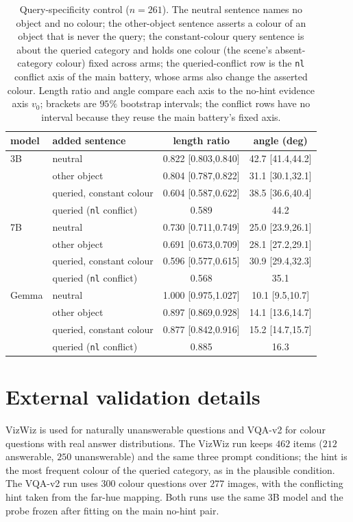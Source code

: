 \documentclass[10pt]{article}
\begin{document}
\begin{table}[h]
\centering
\small
\caption{Query-specificity control ($n=261$). The neutral sentence names no
object and no colour; the other-object sentence asserts a colour of an object
that is never the query; the constant-colour query sentence is about the
queried category and holds one colour (the scene's absent-category colour)
fixed across arms; the queried-conflict row is the \texttt{nl} conflict axis
of the main battery, whose arms also change the asserted colour. Length ratio
and angle compare each axis to the no-hint evidence axis $v_0$; brackets are
$95\%$ bootstrap intervals; the conflict rows have no interval because they
reuse the main battery's fixed axis.}
\label{tab:query-control}
\begin{tabular}{llcc}
\toprule
model & added sentence & length ratio & angle (deg) \\
\midrule
3B & neutral & 0.822 [0.803,0.840] & 42.7 [41.4,44.2] \\
   & other object & 0.804 [0.787,0.822] & 31.1 [30.1,32.1] \\
   & queried, constant colour & 0.604 [0.587,0.622] & 38.5 [36.6,40.4] \\
   & queried (\texttt{nl} conflict) & 0.589 & 44.2 \\
\midrule
7B & neutral & 0.730 [0.711,0.749] & 25.0 [23.9,26.1] \\
   & other object & 0.691 [0.673,0.709] & 28.1 [27.2,29.1] \\
   & queried, constant colour & 0.596 [0.577,0.615] & 30.9 [29.4,32.3] \\
   & queried (\texttt{nl} conflict) & 0.568 & 35.1 \\
\midrule
Gemma & neutral & 1.000 [0.975,1.027] & 10.1 [9.5,10.7] \\
      & other object & 0.897 [0.869,0.928] & 14.1 [13.6,14.7] \\
      & queried, constant colour & 0.877 [0.842,0.916] & 15.2 [14.7,15.7] \\
      & queried (\texttt{nl} conflict) & 0.885 & 16.3 \\
\bottomrule
\end{tabular}
\end{table}

\section{External validation details}
\label{app:external}

VizWiz is used for naturally unanswerable questions and VQA-v2 for colour questions with real answer distributions. The VizWiz run keeps $462$ items ($212$ answerable, $250$ unanswerable) and the same three prompt conditions; the hint is the most frequent colour of the queried category, as in the plausible condition. The VQA-v2 run uses $300$ colour questions over $277$ images, with the conflicting hint taken from the far-hue mapping. Both runs use the same 3B model and the probe frozen after fitting on the main no-hint pair.
\end{document}
